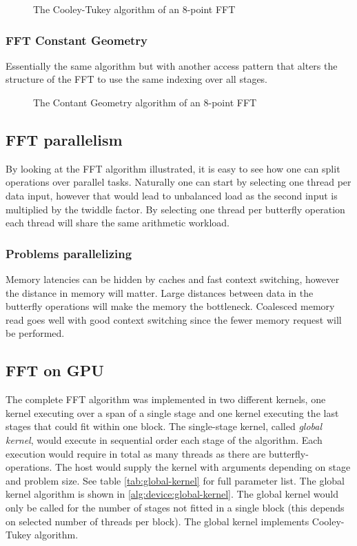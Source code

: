 \begin{figure}
	
	\caption{The Cooley-Tukey algorithm of an 8-point FFT}
	\label{fig:flowgraph-16}
\end{figure}

\subsubsection{FFT Constant Geometry}

Essentially the same algorithm but with another access pattern that alters the structure of the FFT to use the same indexing over all stages.

\begin{figure}
	
	\caption{The Contant Geometry algorithm of an 8-point FFT}
	\label{fig:flowgraph-16}
\end{figure}

\subsection{FFT parallelism}

By looking at the FFT algorithm illustrated, it is easy to see how one can split operations over parallel tasks. Naturally one can start by selecting one thread per data input, however that would lead to unbalanced load as the second input is multiplied by the twiddle factor. By selecting one thread per butterfly operation each thread will share the same arithmetic workload.

\subsubsection{Problems parallelizing}

Memory latencies can be hidden by caches and fast context switching, however the distance in memory will matter. Large distances between data in the butterfly operations will make the memory the bottleneck. Coalesced memory read goes well with good context switching since the fewer memory request will be performed.

\subsection{FFT on GPU}

The complete FFT algorithm was implemented in two different kernels, one kernel executing over a span of a single stage and one kernel executing the last stages that could fit within one block. The single-stage kernel, called \textit{global kernel}, would execute in sequential order each stage of the algorithm. Each execution would require in total as many threads as there are butterfly-operations. The host would supply the kernel with arguments depending on stage and problem size. See table \ref{tab:global-kernel} for full parameter list. The global kernel algorithm is shown in \ref{alg:device:global-kernel}. The global kernel would only be called for the number of stages not fitted in a single block (this depends on selected number of threads per block). The global kernel implements Cooley-Tukey algorithm.

